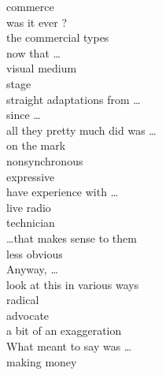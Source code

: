 \documentclass[12pt]{article}
\begin{document}
commerce \\
was it ever ? \\
the commercial types \\
now that \dots \\
visual medium \\
stage \\
straight adaptations from \dots \\
since \dots \\
all they pretty much did was \dots \\
on the mark \\
nonsynchronous \\
expressive \\
have experience with \dots \\
live radio \\
technician \\
\dots that makes sense to them \\
less obvious \\
Anyway, \dots \\
look at this in various ways \\
radical \\
advocate \\
a bit of an exaggeration \\
What meant to say was \dots \\
making money \\
\end{document}
